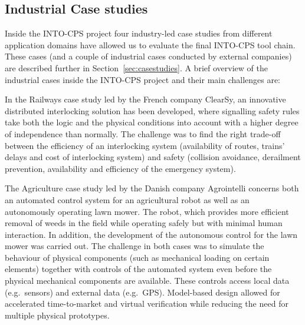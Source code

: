 \subsection{Industrial Case studies}
Inside the INTO-CPS project four industry-led case studies from different application domains have allowed us to evaluate the final INTO-CPS tool chain. These cases (and a couple of industrial cases conducted by external companies) are described further in Section~\ref{sec:casestudies}. A brief overview of the industrial cases inside the INTO-CPS project and their main challenges are:

In the Railways case study led by the French company ClearSy, an innovative distributed interlocking solution has been developed, where signalling safety rules take both the logic and the physical conditions into account with a higher degree of independence than normally. The challenge was to find the right trade-off between the efficiency of an interlocking system (availability of routes, trains' delays and cost of interlocking system) and safety (collision avoidance, derailment prevention, availability and efficiency of the emergency system).

The Agriculture case study led by the Danish company Agrointelli concerns both an automated control system for an agricultural robot as well as an autonomously operating lawn mower. The robot, which provides more efficient removal of weeds in the field while operating safely but with minimal human interaction. In addition, the development of the autonomous control for the lawn mower was carried out. The challenge in both cases was to simulate the behaviour of physical components (such as mechanical loading on certain elements) together with controls of the automated system even before the physical mechanical components are available. These controls access local data (e.g.\ sensors) and external data (e.g.\ GPS). Model-based design allowed for accelerated time-to-market and virtual verification while reducing the need for multiple physical prototypes.

